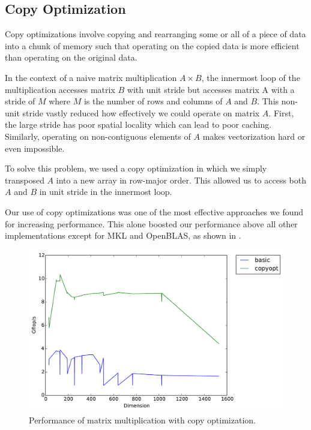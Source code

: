 \subsection{Copy Optimization}
Copy optimizations involve copying and rearranging some or all of a piece of
data into a chunk of memory such that operating on the copied data is more
efficient than operating on the original data.

In the context of a naive matrix multiplication $A \times B$, the innermost
loop of the multiplication accesses matrix $B$ with unit stride but accesses
matrix A with a stride of $M$ where $M$ is the number of rows and columns of
$A$ and $B$. This non-unit stride vastly reduced how effectively we could
operate on matrix $A$. First, the large stride has poor spatial locality which
can lead to poor caching. Similarly, operating on non-contiguous elements of
$A$ makes vectorization hard or even impossible.

To solve this problem, we used a copy optimization in which we simply
transposed $A$ into a new array in row-major order. This allowed us to access
both $A$ and $B$ in unit stride in the innermost loop.

Our use of copy optimizations was one of the most effective approaches we found
for increasing performance. This alone boosted our performance above all other
implementations except for MKL and OpenBLAS, as shown in .

\begin{figure}[h]
  \centering
  \includegraphics[width=\textwidth]{img/timing_copyopt.pdf}
  \caption{Performance of matrix multiplication with copy optimization.}
  \label{fig:copy}
\end{figure}
